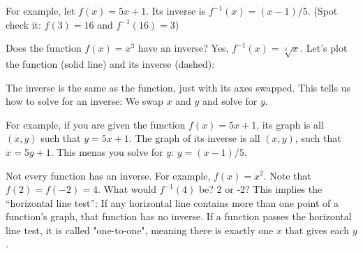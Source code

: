 For example, let $f(x) = 5x + 1$. Its inverse is
$f^{-1}(x) = (x - 1)/5$. (Spot check it: $f(3) = 16$ and $f^{-1}(16) = 3$)

Does the function $f(x) = x^3$ have an inverse? Yes, $f^{-1}(x) =
\sqrt[3]{x}$. Let's plot the function (solid line) and its inverse (dashed):


The inverse is the same as the function, just with its axes swapped.
This tells us how to solve for an inverse: We swap $x$ and $y$ and
solve for $y$.

For example, if you are given the function $f(x) = 5x + 1$, its graph
is all $(x,y)$ such that $y = 5x + 1$.  The graph of its inverse is
all $(x, y)$, such that $x = 5y + 1$. This menas you solve for $y$: $y = (x -
1)/5$.

Not every function has an inverse.  For example, $f(x) = x^2$.  Note
that $f(2) = f(-2) = 4$.  What would $f^{-1}(4)$ be? 2 or -2?  This
implies the ``horizontal line test'': If any horizontal line contains
more than one point of a function's graph, that function has no
inverse. If a function passes the horizontal line test, it is called 
"one-to-one", meaning there is exactly one $x$ that gives each $y$. \\

